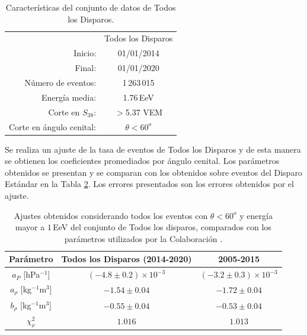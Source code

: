 \begin{table}[H]
  \centering
  \begin{tabular}{r|c|}
    \cline{2-2}
                & Todos los Disparos \\ \cline{2-2}
  Inicio:              & 01/01/2014\\ 
  Final:               & 01/01/2020       							\\ 
  Número de eventos:   & 1\,263\,015							\\ 
  Energía media:       & 1.76\,EeV       				\\  %
  Corte en $S_{38}$:   & $>$5.37 VEM        				\\ 
  Corte en ángulo cenital:& $\theta < 60^o$ 				\\ \cline{2-2}
  \end{tabular}
\caption{Características del conjunto de datos de Todos los Disparos.} \label{tabla:caracteristicas_ALL}
\end{table}

Se realiza un ajuste de la tasa de eventos de Todos los Disparos y de esta manera se obtienen los coeficientes promediados por ángulo cenital. Los parámetros obtenidos se presentan y se comparan con los obtenidos sobre eventos del Disparo Estándar \cite{aab2017impact} en la Tabla \ref{tabla:parametros_ALL}. Los errores presentados son los errores obtenidos por el ajuste.  

\begin{table}[H]
  \centering
  \begin{tabular}{c|c|c}
  {Parámetro}                 & Todos los Disparos (2014-2020)& {2005-2015}    \cite{aab2017impact}              \\ \hline \hline
  $a_P$ [hPa$^{-1}$]          & $(-4.8 \pm 0.2)\times 10^{-3}$& $(-3.2 \pm 0.3)\times 10^{-3}$    \\ \hline
  $a_\rho$ [kg$^{-1}$m$^3$]   & $-1.54 \pm 0.04 $             & $-1.72 \pm 0.04$                  \\ \hline
  $b_\rho$ [kg$^{-1}$m$^3$]   & $-0.55 \pm 0.04$              & $-0.53 \pm 0.04$                  \\ \hline
  $\chi^2_\nu$                & $1.016$                       & $1.013$                           \\ 
  \end{tabular} 
  \caption{Ajustes obtenidos considerando todos los eventos con $\theta<60^o$ y energía mayor a $1\,$EeV del conjunto de Todos los disparos, comparados con los parámetros utilizados por la Colaboración \cite{aab2017impact}.} \label{tabla:parametros_ALL}
\end{table}


